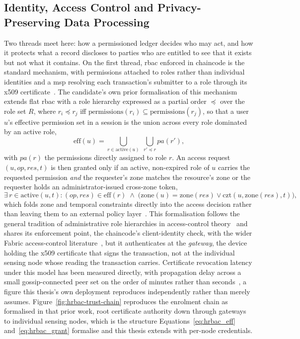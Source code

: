 \documentclass[12pt,a4paper,oneside]{book}
\begin{document}
\subsection{Identity, Access Control and Privacy-Preserving Data Processing}
\label{subsec:lit_privacy}

Two threads meet here: how a permissioned ledger decides who may act, and
how it protects what a record discloses to parties who are entitled to see
that it exists but not what it contains. On the first thread, \gls{rbac}
enforced in chaincode is the standard mechanism, with permissions attached
to roles rather than individual identities and a \gls{msp} resolving each
transaction's submitter to a role through its
\gls{x509} certificate~\cite{mdpiAccessControl, hyperledger2022msp}. The
candidate's own prior formalisation of this
mechanism~\cite{beloasone2025hrbac} extends flat \gls{rbac} with a role
hierarchy expressed as a partial order $\preceq$ over the role set $R$,
where $r_i \preceq r_j$ iff $\mathrm{permissions}(r_i) \subseteq
\mathrm{permissions}(r_j)$, so that a user $u$'s effective permission set
in a session is the union across every role dominated by an active role,
\begin{equation}
\mathrm{eff}(u) = \bigcup_{r \in \mathrm{active}(u)} \; \bigcup_{r' \preceq r} pa(r'),
\label{eq:hrbac_eff}
\end{equation}
with $pa(r)$ the permissions directly assigned to role $r$. An access
request $(u, op, res, t)$ is then granted only if an active, non-expired
role of $u$ carries the requested permission \emph{and} the requester's
zone matches the resource's zone or the requester holds an
administrator-issued cross-zone token,
\begin{equation}
\exists\, r \in \mathrm{active}(u,t) : (op,res) \in \mathrm{eff}(r)
\;\land\; \bigl(\mathrm{zone}(u) = \mathrm{zone}(res) \lor
\mathrm{czt}(u,\mathrm{zone}(res),t)\bigr),
\label{eq:hrbac_grant}
\end{equation}
which folds zone and temporal constraints directly into the access
decision rather than leaving them to an external policy
layer~\cite{beloasone2025hrbac}. This formalisation follows the general
tradition of administrative role hierarchies in access-control
theory~\cite{lu2022revocation} and shares its enforcement point, the
chaincode's client-identity check, with the wider Fabric access-control
literature~\cite{mdpiAccessControl}, but it authenticates at the
\emph{gateway}, the device holding the \gls{x509} certificate that signs
the transaction, not at the individual sensing node whose reading the
transaction carries. Certificate revocation latency under this model has
been measured directly, with propagation delay across a small
gossip-connected peer set on the order of minutes rather than
seconds~\cite{lu2022revocation}, a figure this thesis's own deployment
reproduces independently rather than merely assumes. Figure~\ref{fig:hrbac-trust-chain}
reproduces the enrolment chain as formalised in that prior work, root
certificate authority down through gateways to individual sensing nodes,
which is the structure Equations~\ref{eq:hrbac_eff} and~\ref{eq:hrbac_grant}
formalise and this thesis extends with per-node credentials.
\end{document}
